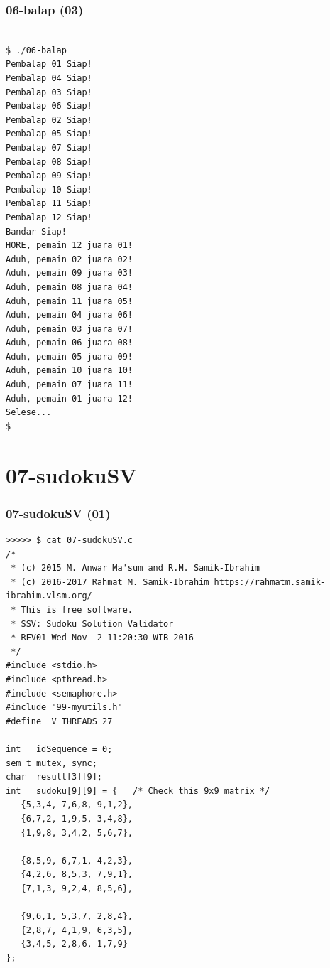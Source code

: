 \documentclass[aspectratio=169, xcolor=table, notheorems, hyperref={pdfpagelabels=false}]{beamer}
\begin{document}
\begin{frame}[fragile]
\frametitle{06-balap (03)}
\begin{lstlisting}[basicstyle=\ttfamily\tiny]

$ ./06-balap 
Pembalap 01 Siap!
Pembalap 04 Siap!
Pembalap 03 Siap!
Pembalap 06 Siap!
Pembalap 02 Siap!
Pembalap 05 Siap!
Pembalap 07 Siap!
Pembalap 08 Siap!
Pembalap 09 Siap!
Pembalap 10 Siap!
Pembalap 11 Siap!
Pembalap 12 Siap!
Bandar Siap!
HORE, pemain 12 juara 01!
Aduh, pemain 02 juara 02!
Aduh, pemain 09 juara 03!
Aduh, pemain 08 juara 04!
Aduh, pemain 11 juara 05!
Aduh, pemain 04 juara 06!
Aduh, pemain 03 juara 07!
Aduh, pemain 06 juara 08!
Aduh, pemain 05 juara 09!
Aduh, pemain 10 juara 10!
Aduh, pemain 07 juara 11!
Aduh, pemain 01 juara 12!
Selese...
$ 

\end{lstlisting}
\end{frame}

\section{07-sudokuSV}
\begin{frame}[fragile]
\frametitle{07-sudokuSV (01)}
\begin{lstlisting}[basicstyle=\ttfamily\tiny]
>>>>> $ cat 07-sudokuSV.c
/*
 * (c) 2015 M. Anwar Ma'sum and R.M. Samik-Ibrahim 
 * (c) 2016-2017 Rahmat M. Samik-Ibrahim https://rahmatm.samik-ibrahim.vlsm.org/
 * This is free software.
 * SSV: Sudoku Solution Validator 
 * REV01 Wed Nov  2 11:20:30 WIB 2016
 */
#include <stdio.h> 
#include <pthread.h>
#include <semaphore.h>
#include "99-myutils.h"
#define  V_THREADS 27

int   idSequence = 0;
sem_t mutex, sync;
char  result[3][9];
int   sudoku[9][9] = {   /* Check this 9x9 matrix */
   {5,3,4, 7,6,8, 9,1,2},
   {6,7,2, 1,9,5, 3,4,8},
   {1,9,8, 3,4,2, 5,6,7},

   {8,5,9, 6,7,1, 4,2,3},
   {4,2,6, 8,5,3, 7,9,1},
   {7,1,3, 9,2,4, 8,5,6},

   {9,6,1, 5,3,7, 2,8,4},
   {2,8,7, 4,1,9, 6,3,5},
   {3,4,5, 2,8,6, 1,7,9}
};

\end{lstlisting}
\end{frame}
\end{document}
